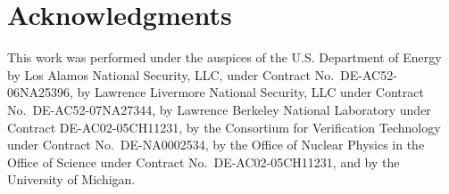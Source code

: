 \documentclass[preprint,12pt]{elsarticle}
\begin{document}
\section*{Acknowledgments}

This work was performed under the auspices of the U.S. Department of Energy by Los Alamos National Security, LLC, under Contract No.~DE-AC52-06NA25396, by Lawrence Livermore National Security, LLC under Contract No.~DE-AC52-07NA27344, by Lawrence Berkeley National Laboratory under Contract DE-AC02-05CH11231, by the Consortium for Verification Technology under Contract No.~DE-NA0002534, by the Office of Nuclear Physics in the Office of Science under Contract No.~DE-AC02-05CH11231, and by the University of Michigan.



\end{document}
